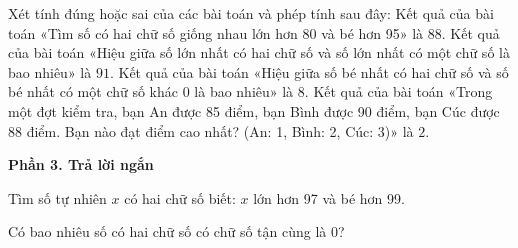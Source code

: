 \begin{ex} %
Xét tính đúng hoặc sai của các bài toán và phép tính sau đây:
\choiceTF
{\True Kết quả của bài toán «Tìm số có hai chữ số giống nhau lớn hơn 80 và bé hơn 95» là $88$.}
{Kết quả của bài toán «Hiệu giữa số lớn nhất có hai chữ số và số lớn nhất có một chữ số là bao nhiêu» là $91$.}
{Kết quả của bài toán «Hiệu giữa số bé nhất có hai chữ số và số bé nhất có một chữ số khác 0 là bao nhiêu» là $8$.}
{\True Kết quả của bài toán «Trong một đợt kiểm tra, bạn An được 85 điểm, bạn Bình được 90 điểm, bạn Cúc được 88 điểm. Bạn nào đạt điểm cao nhất? (An: 1, Bình: 2, Cúc: 3)» là $2$.}
\end{ex}

\textbf{Phần 3. Trả lời ngắn}

\begin{ex} %
Tìm số tự nhiên $x$ có hai chữ số biết: $x$ lớn hơn 97 và bé hơn 99.
\end{ex}

\begin{ex} %
Có bao nhiêu số có hai chữ số có chữ số tận cùng là 0?
\end{ex}

